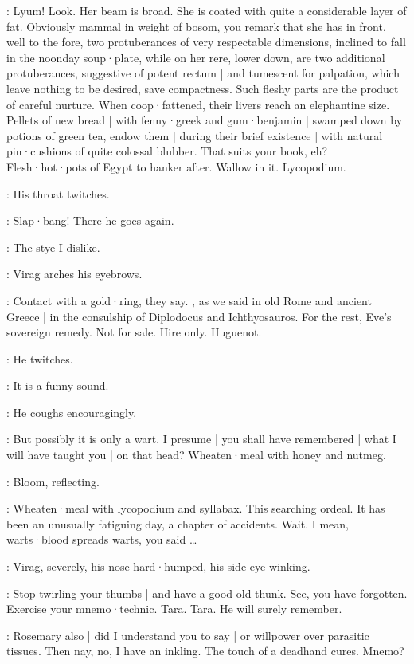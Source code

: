 \Virag:
Lyum!
Look.
Her beam is broad.
She is coated with quite a considerable layer of fat.
Obviously mammal in weight of bosom,
you remark that she has in front,
well to the fore,
two protuberances of very respectable dimensions,
inclined to fall in the noonday soup·plate,
while on her rere,
lower down,
are two additional protuberances,
suggestive of potent rectum |
and tumescent for palpation,
which leave nothing to be desired,
save compactness.
Such fleshy parts are the product of careful nurture.
When coop·fattened,
their livers reach an elephantine size.
Pellets of new bread |
with fenny·greek and gum·benjamin |
swamped down by potions of green tea,
endow them |
during their brief existence |
with natural pin·cushions of quite colossal blubber.
That suits your book,
eh?
Flesh·hot·pots of Egypt to hanker after.
Wallow in it.
Lycopodium.

:
His throat twitches.

\Virag:
Slap·bang!
There he goes again.

\Bloom:
The stye I dislike.

:
Virag arches his eyebrows.

\Virag:
Contact with a gold·ring,
they say.
,
as we said in old Rome and ancient Greece |
in the consulship of Diplodocus and Ichthyosauros.
For the rest,
Eve's sovereign remedy.
Not for sale.
Hire only.
Huguenot.

:
He twitches.

\Virag:
It is a funny sound.

:
He coughs encouragingly.

\Virag:
But possibly it is only a wart.
I presume |
you shall have remembered |
what I will have taught you |
on that head?
Wheaten·meal with honey and nutmeg.

:
Bloom,
reflecting.

\Bloom:
Wheaten·meal with lycopodium and syllabax.
This searching ordeal.
It has been an unusually fatiguing day,
a chapter of accidents.
Wait.
I mean,
warts·blood spreads warts,
you said \ldots

:
Virag,
severely,
his nose hard·humped,
his side eye winking.

\Virag:
Stop twirling your thumbs |
and have a good old thunk.
See,
you have forgotten.
Exercise your mnemo·technic.
Tara.
Tara.
He will surely remember.

\Bloom:
Rosemary also |
did I understand you to say |
or willpower over parasitic tissues.
Then nay,
no,
I have an inkling.
The touch of a deadhand cures.
Mnemo?%

